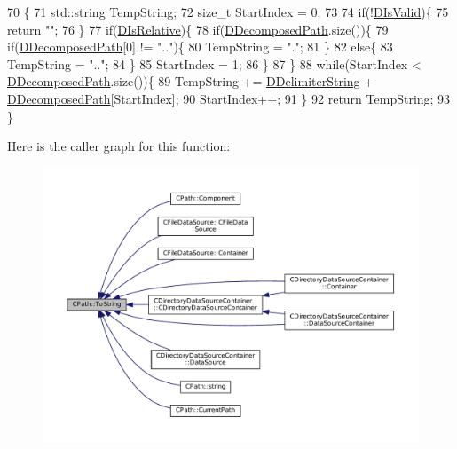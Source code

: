 \begin{DoxyCode}
70                                \{
71     std::string TempString;
72     \textcolor{keywordtype}{size\_t} StartIndex = 0;
73     
74     \textcolor{keywordflow}{if}(!\hyperlink{classCPath_a992aca27a1cba1c3bae3d04438821192}{DIsValid})\{
75         \textcolor{keywordflow}{return} \textcolor{stringliteral}{""};    
76     \}
77     \textcolor{keywordflow}{if}(\hyperlink{classCPath_af705ff149bb2281c67afb84fff550eb9}{DIsRelative})\{
78         \textcolor{keywordflow}{if}(\hyperlink{classCPath_a03ed25209a01e633c107a0c877fc61f8}{DDecomposedPath}.size())\{
79             \textcolor{keywordflow}{if}(\hyperlink{classCPath_a03ed25209a01e633c107a0c877fc61f8}{DDecomposedPath}[0] != \textcolor{stringliteral}{".."})\{
80                 TempString = \textcolor{stringliteral}{"."};   
81             \}
82             \textcolor{keywordflow}{else}\{
83                 TempString = \textcolor{stringliteral}{".."};
84             \}
85             StartIndex = 1;
86         \}
87     \}
88     \textcolor{keywordflow}{while}(StartIndex < \hyperlink{classCPath_a03ed25209a01e633c107a0c877fc61f8}{DDecomposedPath}.size())\{
89         TempString += \hyperlink{classCPath_a88b8652d01ff3359a48dd75126cc5776}{DDelimiterString} + \hyperlink{classCPath_a03ed25209a01e633c107a0c877fc61f8}{DDecomposedPath}[StartIndex];
90         StartIndex++;
91     \}
92     \textcolor{keywordflow}{return} TempString;
93 \}
\end{DoxyCode}
Here is the caller graph for this function\+:\nopagebreak
\begin{figure}[H]
\begin{center}
\leavevmode
\includegraphics[width=350pt]{classCPath_abbafaf377a7e38e0151bd9567d526951_icgraph}
\end{center}
\end{figure}


